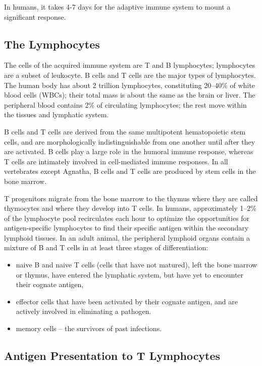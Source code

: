 In humans, it takes 4-7 days for the adaptive immune system to mount a significant response.

\hypertarget{the-lymphocytes}{%
\subsection{The Lymphocytes}\label{the-lymphocytes}}

The cells of the acquired immune system are T and B lymphocytes; lymphocytes are a subset of leukocyte. B cells and T cells are the major types of lymphocytes. The human body has about 2 trillion lymphocytes, constituting 20--40\% of white blood cells (WBCs); their total mass is about the same as the brain or liver. The peripheral blood contains 2\% of circulating lymphocytes; the rest move within the tissues and lymphatic system.

B cells and T cells are derived from the same multipotent hematopoietic stem cells, and are morphologically indistinguishable from one another until after they are activated. B cells play a large role in the humoral immune response, whereas T cells are intimately involved in cell-mediated immune responses. In all vertebrates except Agnatha, B cells and T cells are produced by stem cells in the bone marrow.

T progenitors migrate from the bone marrow to the thymus where they are called thymocytes and where they develop into T cells. In humans, approximately 1--2\% of the lymphocyte pool recirculates each hour to optimize the opportunities for antigen-specific lymphocytes to find their specific antigen within the secondary lymphoid tissues. In an adult animal, the peripheral lymphoid organs contain a mixture of B and T cells in at least three stages of differentiation:

\begin{itemize}
\tightlist
\item
  naive B and naive T cells (cells that have not matured), left the bone marrow or thymus, have entered the lymphatic system, but have yet to encounter their cognate antigen,
\item
  effector cells that have been activated by their cognate antigen, and are actively involved in eliminating a pathogen.
\item
  memory cells -- the survivors of past infections.
\end{itemize}

\hypertarget{antigen-presentation-to-t-lymphocytes}{%
\subsection{Antigen Presentation to T Lymphocytes}\label{antigen-presentation-to-t-lymphocytes}}

